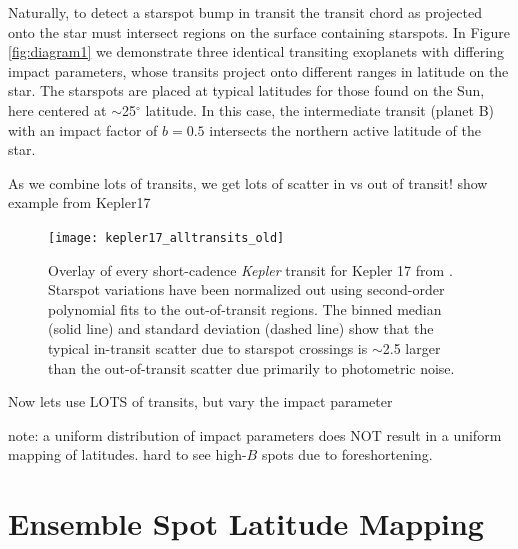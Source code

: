 \documentclass[preprint2]{aastex62}
\newcommand{\Kepler}{\textsl{Kepler}\xspace}
\begin{document}
Naturally, to detect a starspot bump in transit the transit chord as projected onto the star must intersect regions on the surface containing starspots. In Figure \ref{fig:diagram1} we demonstrate three identical transiting exoplanets with differing impact parameters, whose transits project onto different ranges in latitude on the star. The starspots are placed at typical latitudes for those found on the Sun, here centered at $\sim$25$^\circ$ latitude. In this case, the intermediate transit (planet B) with an impact factor of $b=0.5$ intersects the northern active latitude of the star. 


As we combine lots of transits, we get lots of scatter in vs out of transit!
show example from Kepler17


\begin{figure}[!t]
\centering
\texttt{[image: kepler17\_alltransits\_old]}
\caption{
Overlay of every short-cadence \Kepler transit for Kepler 17 from \citet{davenport_phd}. Starspot variations have been normalized out using second-order polynomial fits to the out-of-transit regions. The binned median (solid line) and standard deviation (dashed line) show that the typical in-transit scatter due to starspot crossings is $\sim$2.5 larger than the out-of-transit scatter due primarily to photometric noise.
}
\label{fig:kep17}
\end{figure}

Now lets use LOTS of transits, but vary the impact parameter

note: a uniform distribution of impact parameters does NOT result in a uniform mapping of latitudes. hard to see high-$B$ spots due to foreshortening.








\section{Ensemble Spot Latitude Mapping}



\end{document}
